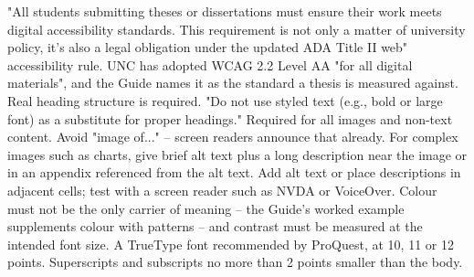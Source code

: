 \thesisrequiretagging
\thesisrequiredocumentlanguage
{}
	{"All students submitting theses or dissertations must ensure their work
	 meets digital accessibility standards. This requirement is not only a
	 matter of university policy, it's also a legal obligation under the updated
	 ADA Title II web" accessibility rule.}
	{UNC has adopted WCAG 2.2 Level AA "for all digital materials", and the
	 Guide names it as the standard a thesis is measured against.}
	{Real heading structure is required. "Do not use styled text (e.g., bold or
	 large font) as a substitute for proper headings."}
	{Required for all images and non-text content. Avoid "image of..." -- screen
	 readers announce that already. For complex images such as charts, give
	 brief alt text plus a long description near the image or in an appendix
	 referenced from the alt text.}
	{Add alt text or place descriptions in adjacent cells; test with a screen
	 reader such as NVDA or VoiceOver.}
	{Colour must not be the only carrier of meaning -- the Guide's worked
	 example supplements colour with patterns -- and contrast must be measured
	 at the intended font size.}
	{A TrueType font recommended by ProQuest, at 10, 11 or 12 points.
	 Superscripts and subscripts no more than 2 points smaller than the body.}
